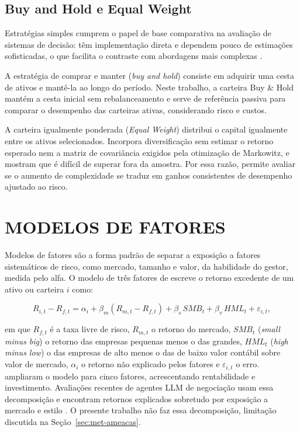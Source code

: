 \subsection{Buy and Hold e Equal Weight}

Estratégias simples cumprem o papel de base comparativa na avaliação de sistemas de decisão: têm implementação direta e dependem pouco de estimações sofisticadas, o que facilita o contraste com abordagens mais complexas \citep{DeMiguel2009}.

A estratégia de comprar e manter (\textit{buy and hold}) consiste em adquirir uma cesta de ativos e mantê-la ao longo do período. Neste trabalho, a carteira Buy \& Hold mantém a cesta inicial sem rebalanceamento e serve de referência passiva para comparar o desempenho das carteiras ativas, considerando risco e custos.

A carteira igualmente ponderada (\textit{Equal Weight}) distribui o capital igualmente entre os ativos selecionados. Incorpora diversificação sem estimar o retorno esperado nem a matriz de covariância exigidos pela otimização de Markowitz, e \citet{DeMiguel2009} mostram que é difícil de superar fora da amostra. Por essa razão, permite avaliar se o aumento de complexidade se traduz em ganhos consistentes de desempenho ajustado ao risco.

\section{MODELOS DE FATORES}

Modelos de fatores são a forma padrão de separar a exposição a fatores sistemáticos de risco, como mercado, tamanho e valor, da habilidade do gestor, medida pelo alfa. O modelo de três fatores de \citet{FamaFrench1993} escreve o retorno excedente de um ativo ou carteira $i$ como:

\begin{equation}
R_{i,t} - R_{f,t} = \alpha_i + \beta_m (R_{m,t} - R_{f,t}) + \beta_s\, \mathit{SMB}_t + \beta_v\, \mathit{HML}_t + \varepsilon_{i,t},
\end{equation}

\noindent em que $R_{f,t}$ é a taxa livre de risco, $R_{m,t}$ o retorno do mercado, $\mathit{SMB}_t$ (\textit{small minus big}) o retorno das empresas pequenas menos o das grandes, $\mathit{HML}_t$ (\textit{high minus low}) o das empresas de alto menos o das de baixo valor contábil sobre valor de mercado, $\alpha_i$ o retorno não explicado pelos fatores e $\varepsilon_{i,t}$ o erro. \citet{FamaFrench2015} ampliaram o modelo para cinco fatores, acrescentando rentabilidade e investimento. Avaliações recentes de agentes LLM de negociação usam essa decomposição e encontram retornos explicados sobretudo por exposição a mercado e estilo \citep{Wang2026beta}. O presente trabalho não faz essa decomposição, limitação discutida na Seção~\ref{sec:met-ameacas}.

